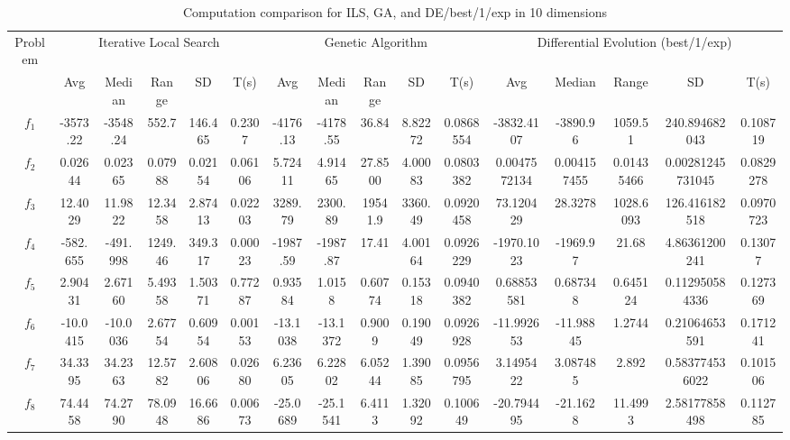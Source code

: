 \documentclass[paper=a4, fontsize=11pt]{scrartcl} %
\numberwithin{equation}{section} %
\numberwithin{figure}{section} %
\numberwithin{table}{section} %
\begin{document}
\begin{landscape}
	\begin{table}
		\tiny
		\centering
		\caption{Computation comparison for ILS, GA, and DE/best/1/exp in 10 dimensions}
		\label{Tab1d}
		\begin{tabular}{c|ccccc|ccccc|ccccc}
		\noalign{\smallskip}\hline\noalign{\smallskip}
		Problem & \multicolumn{5}{c}{Iterative Local Search}& \multicolumn{5}{|c|}{Genetic Algorithm}
	        &  \multicolumn{5}{c}{Differential Evolution (best/1/exp)} \\ 
		\noalign{\smallskip}\hline\noalign{\smallskip}
			 & Avg & Median & Range & SD & T(s) & Avg & Median
	                 & Range & SD & T(s) & Avg & Median & Range & SD &
	                 T(s) \\ 
	\noalign{\smallskip}\hline\noalign{\smallskip}
	 			$f_{1}$  & -3573.22 & -3548.24 & 552.7   & 146.465 & 0.2307  & -4176.13 & -4178.55 & 36.84   & 8.82272 & 0.0868554 & -3832.4107 & -3890.96 & 1059.51 & 240.894682043 & 0.108719\\
				$f_{2}$  &  0.02644 &  0.02365 & 0.07988 & 0.02154 & 0.06106 &  5.72411 &  4.91465 & 27.8500 & 4.00083 & 0.0803382 & 0.0047572134 & 0.004157455 & 0.01435466 & 0.00281245731045 & 0.0829278\\
				$f_{3}$  &  12.4029 &  11.9822 & 12.3458 & 2.87413 & 0.02203 &  3289.79 &  2300.89 & 19541.9 & 3360.49 & 0.0920458 & 73.120429 & 28.3278 & 1028.6093 & 126.416182518 & 0.0970723\\
				$f_{4}$  & -582.655 & -491.998 & 1249.46 & 349.317 & 0.00023 & -1987.59 & -1987.87 & 17.41   & 4.00164 & 0.0926229 & -1970.1023 & -1969.97 & 21.68 & 4.86361200241 & 0.13077\\
				$f_{5}$  &  2.90431 &  2.67160 & 5.49358 & 1.50371 & 0.77287 &  0.93584 &  1.0158  & 0.60774 & 0.15318 & 0.0940382 & 0.68853581 & 0.687348 & 0.645124 & 0.112950584336 & 0.127369\\
				$f_{6}$  & -10.0415 & -10.0036 & 2.67754 & 0.60954 & 0.00153 & -13.1038 & -13.1372 & 0.9009  & 0.19049 & 0.0926928 & -11.992653 & -11.98845 & 1.2744 & 0.21064653591 & 0.171241\\
				$f_{7}$  &  34.3395 &  34.2363 & 12.5782 & 2.60806 & 0.02680 &  6.23605 &  6.22802 & 6.05244 & 1.39085 & 0.0956795 & 3.1495422 & 3.087485 & 2.892 & 0.583774536022 & 0.101506\\
				$f_{8}$  &  74.4458 &  74.2790 & 78.0948 & 16.6686 & 0.00673 & -25.0689 & -25.1541 & 6.4113  & 1.32092 & 0.100649 & -20.794495 & -21.1628 & 11.4993 & 2.58177858498 & 0.112785\\

\end{tabular}
\end{table}
\end{landscape}
\end{document}
